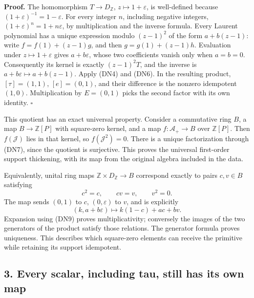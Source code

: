\documentclass[
]{article}
\begin{document}
\textbf{Proof.} The homomorphism \(T\to D_{\mathbb Z}\),
\(z\mapsto1+\varepsilon\), is well-defined because
\((1+\varepsilon)^{-1}=1-\varepsilon\). For every integer \(n\),
including negative integers, \((1+\varepsilon)^n=1+n\varepsilon\), by
multiplication and the inverse formula. Every Laurent polynomial has a
unique expression modulo \((z-1)^2\) of the form \(a+b(z-1)\): write
\(f=f(1)+(z-1)g\), and then \(g=g(1)+(z-1)h\). Evaluation under
\(z\mapsto1+\varepsilon\) gives \(a+b\varepsilon\), whose two
coefficients vanish only when \(a=b=0\). Consequently its kernel is
exactly \((z-1)^2T\), and the inverse is
\(a+b\varepsilon\mapsto a+b(z-1)\). Apply (DN4) and (DN6). In the
resulting product, \([\tau]=(1,1)\), \([e]=(0,1)\), and their difference
is the nonzero idempotent \((1,0)\). Multiplication by \(E=(0,1)\) picks
the second factor with its own identity. \(\square\)

This quotient has an exact universal property. Consider a commutative
ring \(B\), a map \(B\to\mathbb Z[P]\) with square-zero kernel, and a
map \(f:\mathcal A_+\to B\) over \(\mathbb Z[P]\). Then
\(f(\mathcal J)\) lies in that kernel, so \(f(\mathcal J^2)=0\). There
is a unique factorization through (DN7), since the quotient is
surjective. This proves the universal first-order support thickening,
with its map from the original algebra included in the data.

Equivalently, unital ring maps \(\mathbb Z\times D_{\mathbb Z}\to B\)
correspond exactly to pairs \(c,v\in B\) satisfying \[
c^2=c,\qquad cv=v,\qquad v^2=0.
\tag{DN9}
\] The map sends \((0,1)\) to \(c\), \((0,\varepsilon)\) to \(v\), and
is explicitly \[
(k,a+b\varepsilon)\longmapsto k(1-c)+ac+bv.
\tag{DN10}
\] Expansion using (DN9) proves multiplicativity; conversely the images
of the two generators of the product satisfy those relations. The
generator formula proves uniqueness. This describes which square-zero
elements can receive the primitive while retaining its support
idempotent.

\subsection{3. Every scalar, including tau, still has its own
map}\label{every-scalar-including-tau-still-has-its-own-map}
\end{document}
